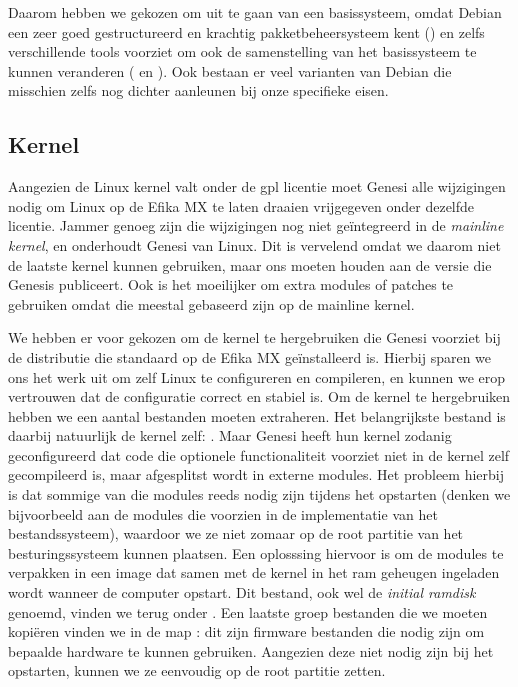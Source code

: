 Daarom hebben we gekozen om uit te gaan van een  basissysteem, omdat Debian een zeer goed gestructureerd en krachtig pakketbeheersysteem kent () en zelfs verschillende tools voorziet om ook de samenstelling van het basissysteem te kunnen veranderen ( en ). Ook bestaan er veel varianten van Debian die misschien zelfs nog dichter aanleunen bij onze specifieke eisen.

\subsection{Kernel}
\label{kiosk:deployment:besturingssysteem:kernel}

Aangezien de Linux kernel valt onder de \ac{gpl} licentie moet Genesi alle wijzigingen nodig om Linux op de Efika MX te laten draaien vrijgegeven onder dezelfde licentie. Jammer genoeg zijn die wijzigingen nog niet geïntegreerd in de \emph{mainline kernel}, en onderhoudt Genesi  van Linux. Dit is vervelend omdat we daarom niet de laatste kernel kunnen gebruiken, maar ons moeten houden aan de versie die Genesis publiceert. Ook is het moeilijker om extra modules of patches te gebruiken omdat die meestal gebaseerd zijn op de mainline kernel.

We hebben er voor gekozen om de kernel te hergebruiken die Genesi voorziet bij de distributie die standaard op de Efika MX geïnstalleerd is. Hierbij sparen we ons het werk uit om zelf Linux te configureren en compileren, en kunnen we erop vertrouwen dat de configuratie correct en stabiel is. Om de kernel te hergebruiken hebben we een aantal bestanden moeten extraheren. Het belangrijkste bestand is daarbij natuurlijk de kernel zelf: . Maar Genesi heeft hun kernel zodanig geconfigureerd dat code die optionele functionaliteit voorziet niet in de kernel zelf gecompileerd is, maar afgesplitst wordt in externe modules. Het probleem hierbij is dat sommige van die modules reeds nodig zijn tijdens het opstarten (denken we bijvoorbeeld aan de modules die voorzien in de implementatie van het bestandssysteem), waardoor we ze niet zomaar op de root partitie van het besturingssysteem kunnen plaatsen. Een oplosssing hiervoor is om de modules te verpakken in een image dat samen met de kernel in het \ac{ram} geheugen ingeladen wordt wanneer de computer opstart. Dit bestand, ook wel de \emph{initial ramdisk} genoemd, vinden we terug onder . Een laatste groep bestanden die we moeten kopiëren vinden we in de map : dit zijn firmware bestanden die nodig zijn om bepaalde hardware te kunnen gebruiken. Aangezien deze niet nodig zijn bij het opstarten, kunnen we ze eenvoudig op de root partitie zetten.

